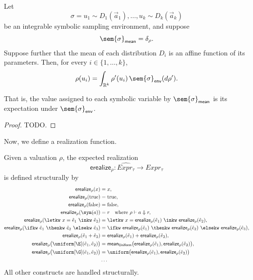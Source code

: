 \begin{lemma}
  \label{lem:mean-valuation-agreement}

  Let
  \[
    \sigma
    =
    u_1\sim D_1(\vec a_1),\ldots,
    u_k\sim D_k(\vec a_k)
  \]
  be an integrable symbolic sampling environment, and suppose
  \[
    \sem{\sigma}_{\mathsf{mean}}=\delta_\rho.
  \]
  Suppose further that the mean of each distribution $D_i$ is an affine
  function of its parameters. Then, for every $i\in\{1,\ldots,k\}$,
  \[
    \rho(u_i)
    =
    \int_{\mathbb R^k}
      \rho'(u_i)\,
      \sem{\sigma}_{\mathsf{env}}(d\rho').
  \]

  That is, the value assigned to each symbolic variable by
  $\sem{\sigma}_{\mathsf{mean}}$ is its expectation under
  $\sem{\sigma}_{\mathsf{env}}$.
\end{lemma}

\begin{proof}
  TODO.
\end{proof}

Now, we define a realization function.

\begin{definition}
  Given a valuation $\rho$, the expected realization
  \[
    \mathsf{erealize}_\rho :
    \widehat{Expr_\tau}\to Expr_\tau
  \]
  is defined structurally by
  \begin{align*}
    \mathsf{erealize}_\rho(x)
    &=
    x,
    \\
    \mathsf{erealize}_\rho(\text{true})
    &=
    \text{true},
    \\
    \mathsf{erealize}_\rho(\text{false})
    &=
    \text{false},
    \\
    \mathsf{erealize}_\rho(\sym(a))
    &=
    r
    \quad \text{where }\rho\vdash a\Downarrow r,
    \\
    \mathsf{erealize}_\rho
      (\letkw\ x=\hat e_1\ \inkw\ \hat e_2)
    &=
    \letkw\ x=\mathsf{erealize}_\rho(\hat e_1)
    \ \inkw\ \mathsf{erealize}_\rho(\hat e_2),
    \\
    \mathsf{erealize}_\rho
      (\ifkw\ \hat e_1\ \thenkw\ \hat e_2\ \elsekw\ \hat e_3)
    &=
    \ifkw\ \mathsf{erealize}_\rho(\hat e_1)
    \ \thenkw\ \mathsf{erealize}_\rho(\hat e_2)
    \ \elsekw\ \mathsf{erealize}_\rho(\hat e_3),
    \\
    \mathsf{erealize}_\rho(\hat e_1+\hat e_2)
    &=
    \mathsf{erealize}_\rho(\hat e_1)
    +
    \mathsf{erealize}_\rho(\hat e_2),
    \\
    \mathsf{erealize}_\rho
      \bigl(\uniform[\E](\hat e_1,\hat e_2)\bigr)
    &=
    \mathsf{mean}_{\mathsf{Uniform}}
      \bigl(
        \mathsf{erealize}_\rho(\hat e_1),
        \mathsf{erealize}_\rho(\hat e_2)
      \bigr),
    \\
    \mathsf{erealize}_\rho
      \bigl(\uniform[\G](\hat e_1,\hat e_2)\bigr)
    &=
    \uniform\bigl(
      \mathsf{erealize}_\rho(\hat e_1),
      \mathsf{erealize}_\rho(\hat e_2)
    \bigr) \\
    &\ldots
  \end{align*}
  All other constructs are handled structurally.
\end{definition}

